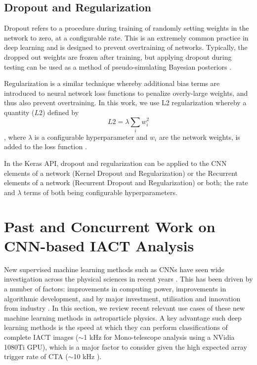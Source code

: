 \subsection{Dropout and Regularization}
Dropout refers to a procedure during training of randomly setting weights in the network to zero, at a configurable rate. This is an extremely common practice in deep learning and is designed to prevent overtraining of networks. Typically, the dropped out weights are frozen after training, but applying dropout during testing can be used as a method of pseudo-simulating Bayesian posteriors \cite{mike}\cite{gal2015}. 

Regularization is a similar technique whereby additional bias terms are introduced to neural network loss functions to penalize overly-large weights, and thus also prevent overtraining. In this work, we use L2 regularization whereby a quantity ($L2$) defined by
\begin{equation}
    L2=\lambda\sum_{i}w_i^2
\end{equation}
, where $\lambda$ is a configurable hyperparameter and $w_i$ are the network weights, is added to the loss function \cite{Keras}.

In the Keras API, dropout and regularization can be applied to the CNN elements of a network (Kernel Dropout and Regularization) or the Recurrent elements of a network (Recurrent Dropout and Regularization) or both; the rate and $\lambda$ terms of both being configurable hyperparameters.

\section{Past and Concurrent Work on CNN-based IACT Analysis}
New supervised machine learning methods such as CNNs have seen wide investigation across the physical sciences in recent years \cite{Shilon} \cite{ErdmannAuger}\cite{erdmannwhite}\cite{tunka}. This has been driven by a number of factors: improvements in computing power, improvements in algorithmic development, and by major investment, utilisation and innovation from industry \cite{dcnn}. In this section, we review recent relevant use cases of these new machine learning methods in astroparticle physics. A key advantage such deep learning methods is the speed at which they can perform classifications of complete IACT images ($\sim$1 kHz for Mono-telescope analysis using a NVidia 1080Ti GPU), which is a major factor to consider given the high expected array trigger rate of CTA ($\sim$10 kHz \cite{trigrate}).

